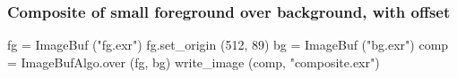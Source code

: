 \subsubsection*{Composite of small foreground over background, with offset}

\begin{code}
    fg = ImageBuf ("fg.exr")
    fg.set_origin (512, 89)
    bg = ImageBuf ("bg.exr")
    comp = ImageBufAlgo.over (fg, bg)
    write_image (comp, "composite.exr")
\end{code}





\chapwidthend
